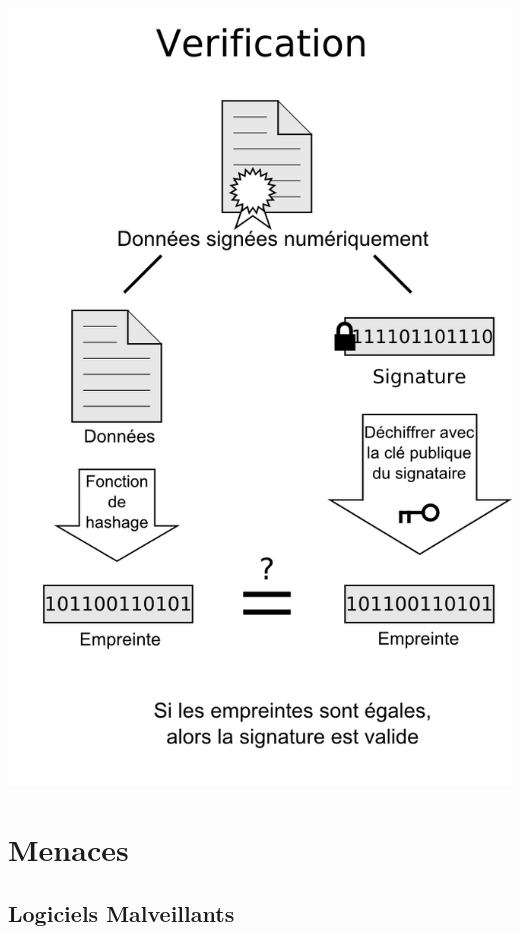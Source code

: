 \documentclass[12pt]{beamer}
\begin{document}
		\begin{frame}{}
			\begin{center}
				\includegraphics[scale=.3]{Digital_Signature_diagram_02.png}
			\end{center}
		\end{frame}


\section{Menaces}
	
	\subsection{Logiciels Malveillants}
	
\end{document}
